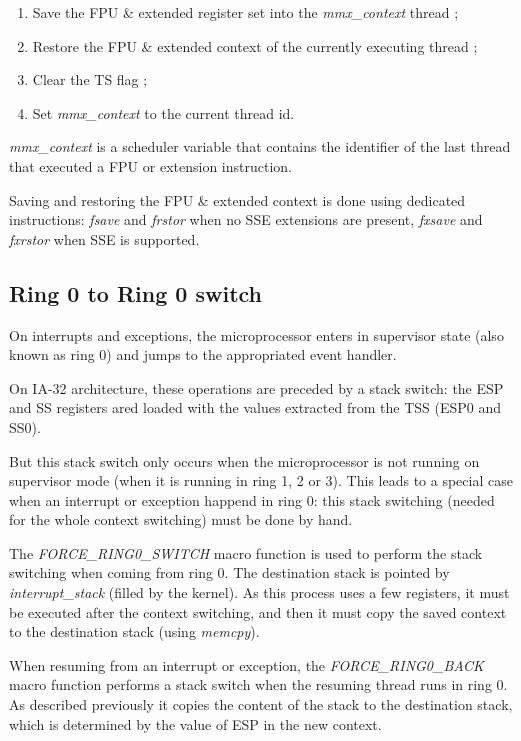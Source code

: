 \begin{enumerate}
\item Save the FPU \& extended register set into the \textit{mmx\_context}
thread ;
\item Restore the FPU \& extended context of the currently executing thread ;
\item Clear the TS flag ;
\item Set \textit{mmx\_context} to the current thread id.
\end{enumerate}

\textit{mmx\_context} is a scheduler variable that contains the
identifier of the last thread that executed a FPU or extension
instruction.

Saving and restoring the FPU \& extended context is done using
dedicated instructions: \textit{fsave} and \textit{frstor} when no SSE
extensions are present, \textit{fxsave} and \textit{fxrstor} when SSE
is supported.

%
%

\subsection{Ring 0 to Ring 0 switch}

On interrupts and exceptions, the microprocessor enters in supervisor
state (also known as ring 0) and jumps to the appropriated event
handler.

On IA-32 architecture, these operations are preceded by a stack
switch: the ESP and SS registers ared loaded with the values extracted
from the TSS (ESP0 and SS0).

But this stack switch only occurs when the microprocessor is not
running on supervisor mode (when it is running in ring 1, 2 or
3). This leads to a special case when an interrupt or exception
happend in ring 0: this stack switching (needed for the whole context
switching) must be done by hand.

The \textit{FORCE\_RING0\_SWITCH} macro function is used to perform
the stack switching when coming from ring 0. The destination stack is
pointed by \textit{interrupt\_stack} (filled by the kernel). As this
process uses a few registers, it must be executed after the context
switching, and then it must copy the saved context to the destination
stack (using \textit{memcpy}).

When resuming from an interrupt or exception, the
\textit{FORCE\_RING0\_BACK} macro function performs a stack switch
when the resuming thread runs in ring 0. As described previously it
copies the content of the stack to the destination stack, which is
determined by the value of ESP in the new context.

